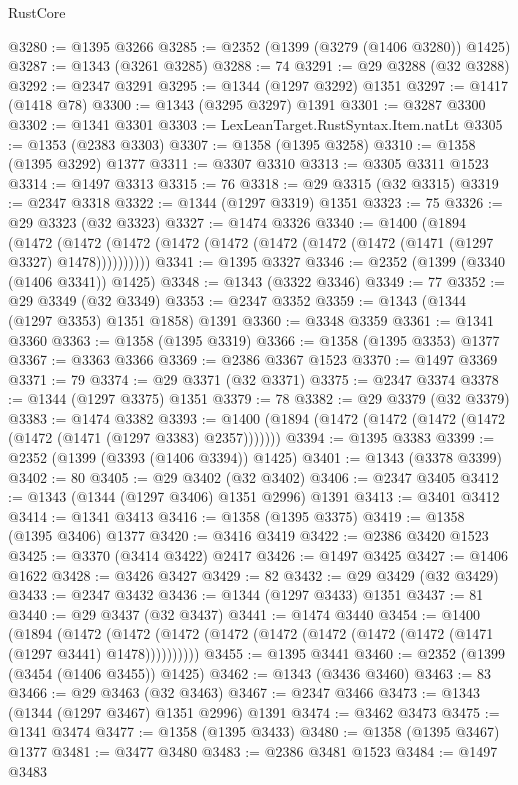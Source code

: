 \begin{lexlean}{RustCore}
\begin{coremodule}
{\begin{coremodule}
{{{{{{{{{{{{{{{{{{{{{{{{{{{{{{{{{{{{{{{{{{{{@3280 := @1395 @3266
@3285 := @2352 (@1399 (@3279 (@1406 @3280)) @1425)
@3287 := @1343 (@3261 @3285)
@3288 := 74
@3291 := @29 @3288 (@32 @3288)
@3292 := @2347 @3291
@3295 := @1344 (@1297 @3292) @1351
@3297 := @1417 (@1418 @78)
@3300 := @1343 (@3295 @3297) @1391
@3301 := @3287 @3300
@3302 := @1341 @3301
@3303 := LexLeanTarget.RustSyntax.Item.natLt
@3305 := @1353 (@2383 @3303)
@3307 := @1358 (@1395 @3258)
@3310 := @1358 (@1395 @3292) @1377
@3311 := @3307 @3310
@3313 := @3305 @3311 @1523
@3314 := @1497 @3313
@3315 := 76
@3318 := @29 @3315 (@32 @3315)
@3319 := @2347 @3318
@3322 := @1344 (@1297 @3319) @1351
@3323 := 75
@3326 := @29 @3323 (@32 @3323)
@3327 := @1474 @3326
@3340 := @1400
    (@1894
      (@1472 (@1472 (@1472 (@1472 (@1472 (@1472 (@1472 (@1472 (@1471 (@1297 @3327) @1478))))))))))
@3341 := @1395 @3327
@3346 := @2352 (@1399 (@3340 (@1406 @3341)) @1425)
@3348 := @1343 (@3322 @3346)
@3349 := 77
@3352 := @29 @3349 (@32 @3349)
@3353 := @2347 @3352
@3359 := @1343 (@1344 (@1297 @3353) @1351 @1858) @1391
@3360 := @3348 @3359
@3361 := @1341 @3360
@3363 := @1358 (@1395 @3319)
@3366 := @1358 (@1395 @3353) @1377
@3367 := @3363 @3366
@3369 := @2386 @3367 @1523
@3370 := @1497 @3369
@3371 := 79
@3374 := @29 @3371 (@32 @3371)
@3375 := @2347 @3374
@3378 := @1344 (@1297 @3375) @1351
@3379 := 78
@3382 := @29 @3379 (@32 @3379)
@3383 := @1474 @3382
@3393 := @1400 (@1894 (@1472 (@1472 (@1472 (@1472 (@1472 (@1471 (@1297 @3383) @2357)))))))
@3394 := @1395 @3383
@3399 := @2352 (@1399 (@3393 (@1406 @3394)) @1425)
@3401 := @1343 (@3378 @3399)
@3402 := 80
@3405 := @29 @3402 (@32 @3402)
@3406 := @2347 @3405
@3412 := @1343 (@1344 (@1297 @3406) @1351 @2996) @1391
@3413 := @3401 @3412
@3414 := @1341 @3413
@3416 := @1358 (@1395 @3375)
@3419 := @1358 (@1395 @3406) @1377
@3420 := @3416 @3419
@3422 := @2386 @3420 @1523
@3425 := @3370 (@3414 @3422) @2417
@3426 := @1497 @3425
@3427 := @1406 @1622
@3428 := @3426 @3427
@3429 := 82
@3432 := @29 @3429 (@32 @3429)
@3433 := @2347 @3432
@3436 := @1344 (@1297 @3433) @1351
@3437 := 81
@3440 := @29 @3437 (@32 @3437)
@3441 := @1474 @3440
@3454 := @1400
    (@1894
      (@1472 (@1472 (@1472 (@1472 (@1472 (@1472 (@1472 (@1472 (@1471 (@1297 @3441) @1478))))))))))
@3455 := @1395 @3441
@3460 := @2352 (@1399 (@3454 (@1406 @3455)) @1425)
@3462 := @1343 (@3436 @3460)
@3463 := 83
@3466 := @29 @3463 (@32 @3463)
@3467 := @2347 @3466
@3473 := @1343 (@1344 (@1297 @3467) @1351 @2996) @1391
@3474 := @3462 @3473
@3475 := @1341 @3474
@3477 := @1358 (@1395 @3433)
@3480 := @1358 (@1395 @3467) @1377
@3481 := @3477 @3480
@3483 := @2386 @3481 @1523
@3484 := @1497 @3483
}}}}}}}}}}}}}}}}}}}}}}}}}}}}}}}}}}}}}}}}}}}}
\end{coremodule}}
\end{coremodule}
\end{lexlean}
